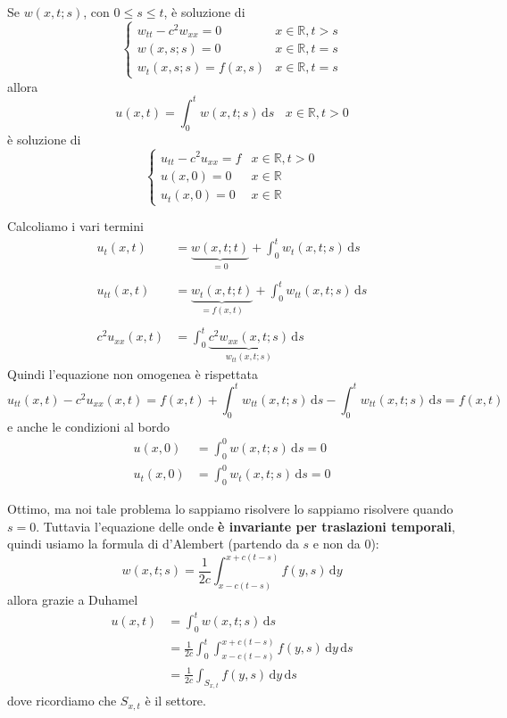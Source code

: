 \documentclass[10pt,a4paper,twoside,openright]{book}
\newcommand{\de}{\,\mathrm d}
\newcommand{\dy}{\de y}
\newcommand{\ds}{\de s}
\begin{document}
\begin{theorem}
 Se $\displaystyle w(x,t;s)$, con $\displaystyle 0\leqslant s\leqslant t$, è soluzione di
\begin{equation*}
\begin{cases}
w_{tt} -c^{2} w_{xx} =\boxed{0} & x\in \mathbb{R} ,\boxed{t >s}\\
w(x,s;s) =0 & x\in \mathbb{R} ,t=s\\
w_{t}(x,s;s) =f(x,s) & x\in \mathbb{R} ,t=s
\end{cases}
\end{equation*}
allora
\begin{equation*}
u(x,t) =\int _{0}^{t} w(x,t;s) \ds\ \ \ \ x\in \mathbb{R} ,t >0
\end{equation*}
è soluzione di
\begin{equation*}
\begin{cases}
u_{tt} -c^{2} u_{xx} =f & x\in \mathbb{R} ,t >0\\
u(x,0) =0 & x\in \mathbb{R}\\
u_{t}(x,0) =0 & x\in \mathbb{R}
\end{cases}
\end{equation*}
\end{theorem}
\begin{dimostrazione}
Calcoliamo i vari termini
\begin{align*}
u_{t}(x,t) & =\underbrace{w(x,t;t)}_{=0} +\int _{0}^{t} w_{t}(x,t;s) \ds\\
 & \\
u_{tt}(x,t) & =\underbrace{w_{t}(x,t;t)}_{=f(x,t)} +\int _{0}^{t} w_{tt}(x,t;s) \ds\\
 & \\
c^{2} u_{xx}(x,t) & =\int _{0}^{t}\underbrace{c^{2} w_{xx}(x,t;s)}_{w_{tt}(x,t;s)} \ds
\end{align*}
Quindi l'equazione non omogenea è rispettata
\begin{equation*}
u_{tt}(x,t) -c^{2} u_{xx}(x,t) =f(x,t) +\int _{0}^{t} w_{tt}(x,t;s) \ds-\int _{0}^{t} w_{tt}(x,t;s) \ds=f(x,t)
\end{equation*}
e anche le condizioni al bordo
\begin{align*}
u(x,0) & =\int _{0}^{0} w(x,t;s) \ds=0\\
u_{t}(x,0) & =\int _{0}^{0} w_{t}(x,t;s) \ds=0
\end{align*}
\end{dimostrazione}
Ottimo, ma noi tale problema lo sappiamo risolvere lo sappiamo risolvere quando $s=0$. Tuttavia l'equazione delle onde \textbf{è invariante per traslazioni temporali}, quindi usiamo la formula di d'Alembert (partendo da $s$ e non da $0$):
\begin{equation*}
w(x,t;s) =\frac{1}{2c}\int _{x-c(t-s)}^{x+c(t-s)} f(y,s) \dy
\end{equation*}
allora grazie a Duhamel
\begin{align*}
u(x,t) & =\int _{0}^{t} w(x,t;s) \ds\\
 & =\frac{1}{2c}\int _{0}^{t}\int _{x-c(t-s)}^{x+c(t-s)} f(y,s) \dy\ds\\
 & =\frac{1}{2c}\int _{S_{x,t}} f(y,s) \dy\ds
\end{align*}
dove ricordiamo che $\displaystyle S_{x,t}$ è il settore.
\end{document}
